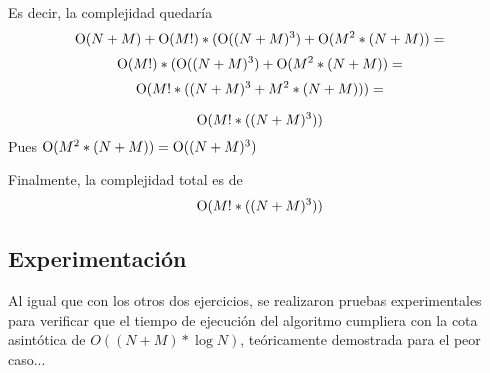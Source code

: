         Es decir, la complejidad quedaría
        \[
            \operatorname{O}(N+M) + \operatorname{O}(M!)*(\operatorname{O}((N+M)^{3}) + \operatorname{O}(M^{2}*(N+M)) =
        \]
        \[
            \operatorname{O}(M!)*(\operatorname{O}((N+M)^{3}) + \operatorname{O}(M^{2}*(N+M)) =
        \]
        \[
            \operatorname{O}(M!*((N+M)^{3} + M^{2}*(N+M))) =
        \]

        \[
            \operatorname{O}(M!*((N+M)^{3}))
        \]
        Pues $\operatorname{O}(M^{2}*(N+M)) = \operatorname{O}((N+M)^{3})$

        Finalmente, la complejidad total es de
        \[
            \operatorname{O}(M!*((N+M)^{3}))
        \] 


    \subsection{Experimentación}

        Al igual que con los otros dos ejercicios, se realizaron pruebas experimentales para verificar que el tiempo de ejecución del algoritmo cumpliera con la cota asintótica de $O((N+M) * \log N)$, teóricamente demostrada para el peor caso...